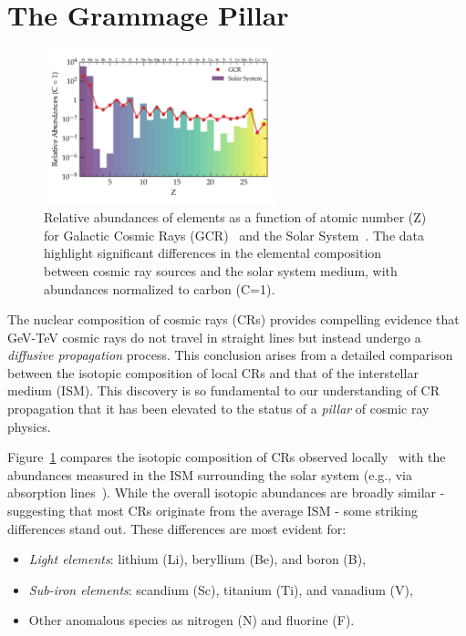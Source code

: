 \section{The Grammage Pillar}

\begin{figure}[t]
\centering
\includegraphics[width=0.6\textwidth]{figures/composition.pdf} 
\caption{Relative abundances of elements as a function of atomic number (Z) for Galactic Cosmic Rays (GCR)~\cite{} and the Solar System~\cite{}. The data highlight significant differences in the elemental composition between cosmic ray sources and the solar system medium, with abundances normalized to carbon (C=1).}
\label{fig:composition}
\end{figure}

The nuclear composition of cosmic rays (CRs) provides compelling evidence that GeV-TeV cosmic rays do not travel in straight lines but instead undergo a \emph{diffusive propagation} process. This conclusion arises from a detailed comparison between the isotopic composition of local CRs and that of the interstellar medium (ISM). This discovery is so fundamental to our understanding of CR propagation that it has been elevated to the status of a \emph{pillar} of cosmic ray physics.  

Figure~\ref{fig:composition} compares the isotopic composition of CRs observed locally~\cite{} with the abundances measured in the ISM surrounding the solar system (e.g., via absorption lines~\cite{}). While the overall isotopic abundances are broadly similar - suggesting that most CRs originate from the average ISM - some striking differences stand out. These differences are most evident for:  
%
\begin{itemize}
\item \emph{Light elements}: lithium (Li), beryllium (Be), and boron (B),  
\item \emph{Sub-iron elements}: scandium (Sc), titanium (Ti), and vanadium (V),  
\item Other anomalous species as nitrogen (N) and fluorine (F).  
\end{itemize}

